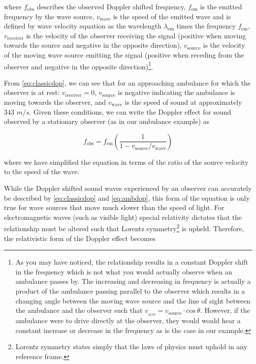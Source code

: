 where \(f_\text{obs}\) describes the observed Doppler shifted frequency,
\(f_\text{em}\) is the emitted frequency by the wave source,
\(v_\text{wave}\) is the speed of the emitted wave and is defined by
wave velocity equation as the wavelength \(\lambda_\text{em}\) times the
frequency \(f_\text{em}\), \(v_\text{receiver}\) is the velocity of the
observer receiving the signal (positive when moving towards the source
and negative in the opposite direction), \(v_\text{source}\) is the
velocity of the moving wave source emitting the signal (positive when
receding from the observer and negative in the opposite
direction)\footnote{As you may have noticed, the relationship results in a constant Doppler shift in the frequency which is not what you would actually observe when an ambulance passes by. The increasing and decreasing in frequency is actually a product of the ambulance passing parallel to the observer which results in a changing angle between the moving wave source and the line of sight between the ambulance and the observer such that $v_{_{LOS}} = v_\text{source} \cdot \text{cos}\ \theta$. However, if the ambulance were to drive directly at the observer, they would would hear a constant increase or decrease in the frequency as is the case in our example.}.

From \cref{eq:classicdop}, we can see that for an
approaching ambulance for which the observer is at rest:
\(v_\text{receiver} = 0\), \(v_\text{source}\) is negative indicating
the ambulance is moving towards the observer, and \(v_\text{wave}\) is
the speed of sound at approximately 343 \(\si{m/s}\). Given these
conditions, we can write the Doppler effect for sound observed by a
stationary observer (as in our ambulance example) as

\begin{equation}f_\text{obs} = f_\text{em} \left (\frac{1}{1 -v_\text{source} / v_\text{wave}}  \right )\label{eq:ambdop}\end{equation}

where we have simplified the equation in terms of the ratio of the
source velocity to the speed of the wave.

While the Doppler shifted sound waves experienced by an observer can
accurately be described by \cref{eq:classicdop} and
\cref{eq:ambdop}, this form of the equation is only true
for wave sources that move much slower than the speed of light. For
electromagnetic waves (such as visible light) special relativity
dictates that the relationship must be altered such that Lorentz
symmetry\footnote{Lorentz symmetry states simply that the laws of physics must uphold in any reference frame.}
is upheld. Therefore, the relativistic form of the Doppler effect
becomes

